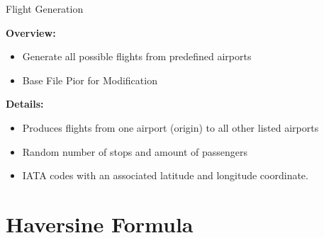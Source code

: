 \documentclass[aspectratio=169,xcolor=dvipsnames]{beamer}
\begin{document}
\begin{frame}{Flight Generation}
\begin{minipage}{0.5\textwidth}
        \vspace{-5.5cm} 
        \textbf{Overview:}
        \begin{itemize}
            \item Generate all possible flights from predefined airports
            \item Base File Pior for Modification
        \end{itemize}
        \vspace{0.5cm}
        \textbf{Details:}
        \begin{itemize}
            \item Produces flights from one airport (origin) to all other listed airports
            \item Random number of stops and amount of passengers
            \item IATA codes with an associated latitude and longitude coordinate.
        \end{itemize}
    \end{minipage}
\end{frame}

\section{Haversine Formula}
\end{document}
